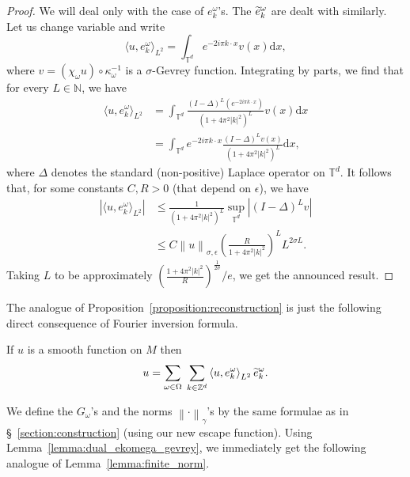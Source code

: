 \documentclass[10pt]{amsart}
\theoremstyle{definition}\newtheorem{defi}[theo]{Definition}\newtheorem{rema}[theo]{Remark}\newtheorem{exam}[theo]{Example}\newtheorem{exem}[theo]{Example}\newtheorem{nota}[theo]{Notation}
\newcommand{\p}[1]{\left(#1\right)}
\newcommand{\n}[1]{\left\|#1\right\|}
\newcommand{\va}[1]{\left|#1\right|}
\newcommand{\brac}[1]{\langle #1 \rangle}
\newcommand{\bbZ}{\mathbb{Z}}
\newcommand{\bbT}{\mathbb{T}}
\newcommand{\bbN}{\mathbb{N}}
\newcommand{\rmd}{\mathrm{d}}
\let\oldtilde\tilde
\renewcommand*{\tilde}[1]{\mathchoice{\widetilde{#1}}{\widetilde{#1}}{\oldtilde{#1}}{\oldtilde{#1}}}
\begin{document}
\begin{proof}
We will deal only with the case of $e_k^\omega$'s. The $\tilde{e}_k^\omega$ are dealt with similarly. Let us change variable and write
\begin{equation*}
\brac{u,e_k^\omega}_{L^2} =\int_{\bbT^d} e^{-2 i \pi k \cdot x} v(x) \rmd x,
\end{equation*}
where $v = (\chi_\omega u) \circ \kappa_\omega^{-1}$ is a $\sigma$-Gevrey function. Integrating by parts, we find that for every $L \in \bbN$, we have
\begin{equation*}
\begin{split}
\brac{u,e_k^\omega}_{L^2} & = \int_{\bbT^d} \frac{(I - \Delta)^L\left(e^{-2 i \pi k \cdot x}\right)}{\left(1+ 4 \pi^2 |k|^2\right)^L} v(x) \rmd x \\
& = \int_{\bbT^d} e^{-2 i \pi k \cdot x} \frac{(I - \Delta)^L v (x)}{\left(1+ 4 \pi^2 |k|^2\right)^L} \rmd x,
\end{split}
\end{equation*}
where $\Delta$ denotes the standard (non-positive) Laplace operator on $\bbT^d$. It follows that, for some constants $C,R > 0$ (that depend on $\epsilon$), we have
\begin{equation*}
\begin{split}
\va{\brac{u,e_k^\omega}_{L^2}} & \leq \frac{1}{\left(1+ 4 \pi^2 |k|^2\right)^L} \sup_{\bbT^d} \va{(I - \Delta)^L v} \\
& \leq C \n{u}_{\sigma,\epsilon} \p{\frac{R}{1+ 4 \pi^2 |k|^2}}^{L} L^{2 \sigma L}.
\end{split}
\end{equation*}
Taking $L$ to be approximately $(\frac{1+ 4 \pi^2 \va{k}^2}{R})^{\frac{1}{2\sigma}}/e$, we get the announced result.
\end{proof}

The analogue of Proposition~\ref{proposition:reconstruction} is just the following direct consequence of Fourier inversion formula.

\begin{prop}
If $u$ is a smooth function on $M$ then
\begin{equation*}
u = \sum_{\omega \in \Omega}\;\sum_{k \in \bbZ^d} \left\langle u, e_k^\omega\right\rangle_{L^2} \tilde{e}^\omega_k.
\end{equation*}
\end{prop}

We define the $G_\omega$'s and the norms $\n{\cdot}_\gamma$'s by the same formulae as in \S~\ref{section:construction} (using our new escape function). Using Lemma~\ref{lemma:dual_ekomega_gevrey}, we immediately get the following analogue of Lemma~\ref{lemma:finite_norm}.
\end{document}
